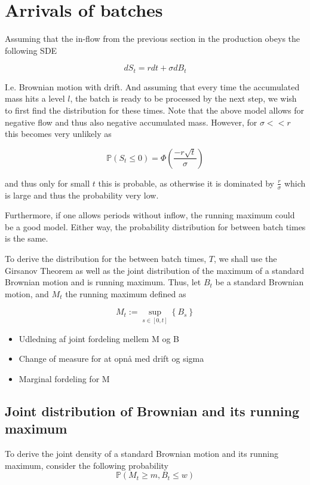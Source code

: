 \documentclass[../Thesis.tex]{subfiles}
\begin{document}




\section{Arrivals of batches}
Assuming that the in-flow from the previous section in the production obeys the following SDE

$$dS_t = r dt + \sigma dB_t$$

I.e. Brownian motion with drift. And assuming that every time the accumulated mass hits a level $l$, the batch is ready to be processed by the next step, we wish to first find the distribution for these times. Note that the above model allows for negative flow and thus also negative accumulated mass. However, for $\sigma << r$ this becomes very unlikely as

$$\mathbb{P} \left( S_t \leq 0\right) = \Phi \left( \frac{-r \sqrt{t}}{\sigma } \right)$$

and thus only for small $t$ this is probable, as otherwise it is dominated by $\frac{r}{\sigma}$ which is large and thus the probability very low.

Furthermore, if one allows periods without inflow, the running maximum could be a good model. Either way, the probability distribution for between batch times is the same.


To derive the distribution for the between batch times, $T$, we shall use the Girsanov Theorem as well as the joint distribution of the maximum of a standard Brownian motion and is running maximum. Thus, let $B_t$ be a standard Brownian motion, and $M_t$ the running maximum defined as

$$M_t := \sup_{s\in [0,t]} \left\{ B_s \right\}$$


\begin{itemize}
    \item Udledning af joint fordeling mellem M og B
    \item Change of measure for at opnå med drift og sigma
    \item Marginal fordeling for M
\end{itemize}





\subsection{Joint distribution of Brownian and its running maximum}
To derive the joint density of a standard Brownian motion and its running maximum, consider the following probability
$$\mathbb{P}\left(M_t \geq m, B_t \leq w\right)$$
\end{document}
